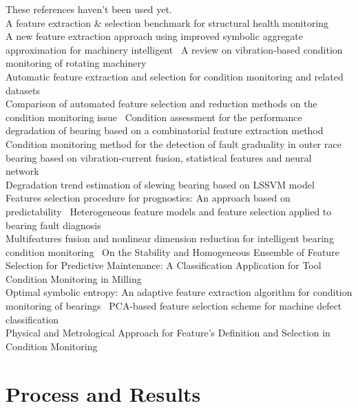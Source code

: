 \documentclass{article}
\begin{document}
These references haven't been used yet.\\
A feature extraction \& selection benchmark for structural health monitoring ~\cite{buckley2023feature}\\
A new feature extraction approach using improved symbolic aggregate approximation for machinery intelligent~\cite{zhang2019new}
A review on vibration-based condition monitoring of rotating machinery~\cite{tiboni2022review}\\
Automatic feature extraction and selection for condition monitoring and related datasets~\cite{schneider2018automatic}\\
Comparison of automated feature selection and reduction methods on the condition monitoring issue~\cite{de2018comparison}
Condition assessment for the performance degradation of bearing based on a combinatorial feature extraction method~\cite{hong2014condition}\\
Condition monitoring method for the detection of fault graduality in outer race bearing based on vibration-current fusion, statistical features and neural network~\cite{saucedo2021condition}\\
Degradation trend estimation of slewing bearing based on LSSVM model~\cite{lu2016degradation}\\
Features selection procedure for prognostics: An approach based on predictability~\cite{javed2012features}
Heterogeneous feature models and feature selection applied to bearing fault diagnosis~\cite{rauber2014heterogeneous}\\
Multifeatures fusion and nonlinear dimension reduction for intelligent bearing condition monitoring~\cite{guo2016multifeatures}
On the Stability and Homogeneous Ensemble of Feature Selection for Predictive Maintenance: A Classification Application for Tool Condition Monitoring in Milling~\cite{assafo2023stability}\\
Optimal symbolic entropy: An adaptive feature extraction algorithm for condition monitoring of bearings~\cite{li2023optimal}
PCA-based feature selection scheme for machine defect classification~\cite{malhi2004pca}\\
Physical and Metrological Approach for Feature’s Definition and Selection in Condition Monitoring~\cite{d2019physical}
\clearpage  
\section{Process and Results}
\end{document}
